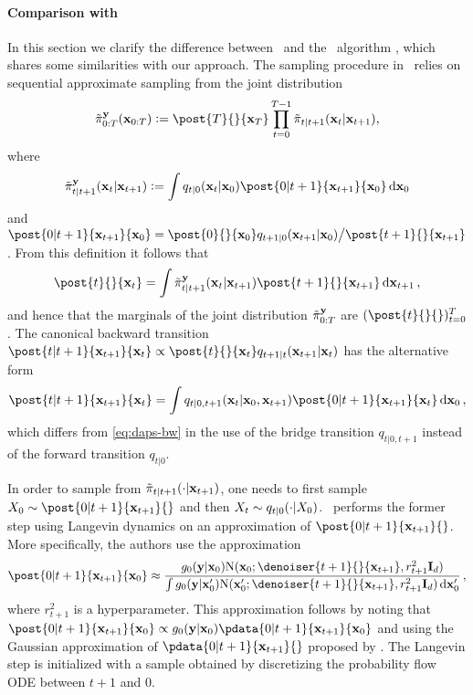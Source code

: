 \paragraph{Comparison with \citet{zhang2024daps}} In this section we clarify the difference between \algo\ and the \daps\ algorithm \cite{zhang2024daps}, which shares some similarities with our approach. The sampling procedure in \daps\ relies on sequential approximate sampling from the joint distribution 
$$ 
    \tilde\pi^\obs _{0:T}(\bx_{0:T}) \eqdef \post{T}{}{\bx_T} \prod_{t = 0}^{T-1} \tilde{\pi}_{t|t+1}(\bx_t | \bx_{t+1}),  
$$ 
where 
\begin{equation}
    \label{eq:daps-bw}
    \tilde\pi^\obs _{t|t+1}(\bx_t | \bx_{t+1}) \eqdef \int \fw{t|0}{\bx_0}{\bx_t} \post{0|t+1}{\bx_{t+1}}{\bx_0} \, \rmd \bx_0
\end{equation}
and $\post{0|t+1}{\bx_{t+1}}{\bx_0} = \post{0}{}{\bx_0} \fw{t+1|0}{\bx_0}{\bx_{t+1}} \big/ \post{t+1}{}{\bx_{t+1}}$. From this definition it follows that 
$$ 
 \post{t}{}{\bx_t} = \int \tilde\pi^\obs _{t|t+1}(\bx_t | \bx_{t+1}) \post{t+1}{}{\bx_{t+1}} \, \rmd \bx_{t+1} \eqsp, 
$$ 
and hence that the marginals of the joint distribution $\tilde\pi^{\mathbf{y}} _{0:T}$ are $(\post{t}{}{})_{t = 0}^T$. The canonical backward transition $\post{t|t+1}{\bx_{t+1}}{\bx_t} \propto \post{t}{}{\bx_t} \fw{t+1|t}{\bx_t}{\bx_{t+1}}$ has the alternative form 
$$ 
    \post{t|t+1}{\bx_{t+1}}{\bx_t} = \int \fw{t|0, t+1}{\bx_0, \bx_{t+1}}{\bx_t} \post{0|t+1}{\bx_{t+1}}{\bx_t} \, \rmd \bx_0 \eqsp,
$$
which differs from \eqref{eq:daps-bw} in the use of the bridge transition $q_{t|0, t+1}$ instead of the forward transition $q_{t|0}$. 

In order to sample from $\tilde\pi_{t|t+1}(\cdot | \mathbf{x}_{t+1})$, one needs to first sample $X_0 \sim \post{0|t+1}{\bx_{t+1}}{}$ and then $X_t \sim \fw{t|0}{X_0}{}$. \daps\ performs the former step using Langevin dynamics on an approximation of $\post{0|t+1}{\bx_{t+1}}{}$. More specifically, the authors use the approximation 
$$ 
\post{0|t+1}{\bx_{t+1}}{\bx_0} \approx \frac{\pot{0}{\bx_0} \normpdf(\bx_0; \denoiser{t+1}{}{\bx_{t+1}}, r^2 _{t+1} \Id_\dimx)}{\int \pot{0}{\bx^\prime _0} \normpdf(\bx^\prime _0; \denoiser{t+1}{}{\bx_{t+1}}, r^2 _{t+1} \Id_\dimx) \, \rmd \bx^\prime _0} \eqsp,
$$ 
where $r^2 _{t+1}$ is a hyperparameter. This approximation follows by noting that $\post{0|t+1}{\bx_{t+1}}{\bx_0} \propto \pot{0}{\bx_0} \pdata{0|t+1}{\bx_{t+1}}{\bx_0}$ and using the Gaussian approximation of $\pdata{0|t+1}{\bx_{t+1}}{}$ proposed by \citet{song2022pseudoinverse}. The Langevin step is initialized with a sample obtained by discretizing the probability flow ODE \cite{song2021score} between $t+1$ and $0$. 

